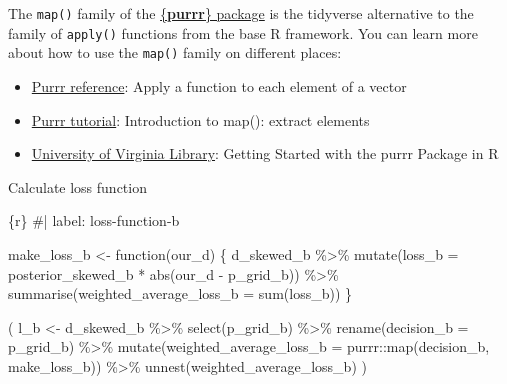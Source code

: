\documentclass[
  letterpaper,
  DIV=11,
  numbers=noendperiod]{scrreprt}
\newenvironment{Shaded}{\begin{snugshade}}{\end{snugshade}}
\newcommand{\AttributeTok}[1]{\textcolor[rgb]{0.40,0.45,0.13}{#1}}
\newcommand{\CommentTok}[1]{\textcolor[rgb]{0.37,0.37,0.37}{#1}}
\newcommand{\ControlFlowTok}[1]{\textcolor[rgb]{0.00,0.23,0.31}{#1}}
\newcommand{\FunctionTok}[1]{\textcolor[rgb]{0.28,0.35,0.67}{#1}}
\newcommand{\InformationTok}[1]{\textcolor[rgb]{0.37,0.37,0.37}{#1}}
\newcommand{\NormalTok}[1]{\textcolor[rgb]{0.00,0.23,0.31}{#1}}
\newcommand{\OtherTok}[1]{\textcolor[rgb]{0.00,0.23,0.31}{#1}}
\newcommand{\SpecialCharTok}[1]{\textcolor[rgb]{0.37,0.37,0.37}{#1}}
\providecommand{\tightlist}{%
  \setlength{\itemsep}{0pt}\setlength{\parskip}{0pt}}\usepackage{longtable,booktabs,array}
\begin{document}
The \texttt{map()} family of the
\href{https://purrr.tidyverse.org/}{\{\textbf{purrr}\} package} is the
tidyverse alternative to the family of \texttt{apply()} functions from
the base R framework. You can learn more about how to use the
\texttt{map()} family on different places:

\begin{itemize}
\tightlist
\item
  \href{https://purrr.tidyverse.org/reference/map.html}{Purrr
  reference}: Apply a function to each element of a vector
\item
  \href{https://jennybc.github.io/purrr-tutorial/ls01_map-name-position-shortcuts.html}{Purrr
  tutorial}: Introduction to map(): extract elements
\item
  \href{https://data.library.virginia.edu/getting-started-with-the-purrr-package-in-r/}{University
  of Virginia Library}: Getting Started with the purrr Package in R
\end{itemize}

Calculate loss function

\begin{Shaded}
\begin{Highlighting}[]
\InformationTok{\textasciigrave{}\textasciigrave{}\textasciigrave{}\{r\}}
\CommentTok{\#| label: loss{-}function{-}b}

\NormalTok{make\_loss\_b }\OtherTok{\textless{}{-}} \ControlFlowTok{function}\NormalTok{(our\_d) \{}
\NormalTok{  d\_skewed\_b }\SpecialCharTok{\%\textgreater{}\%} 
    \FunctionTok{mutate}\NormalTok{(}\AttributeTok{loss\_b =}\NormalTok{ posterior\_skewed\_b }\SpecialCharTok{*} \FunctionTok{abs}\NormalTok{(our\_d }\SpecialCharTok{{-}}\NormalTok{ p\_grid\_b)) }\SpecialCharTok{\%\textgreater{}\%} 
    \FunctionTok{summarise}\NormalTok{(}\AttributeTok{weighted\_average\_loss\_b =} \FunctionTok{sum}\NormalTok{(loss\_b))}
\NormalTok{\}}

\NormalTok{(}
\NormalTok{  l\_b }\OtherTok{\textless{}{-}}
\NormalTok{  d\_skewed\_b }\SpecialCharTok{\%\textgreater{}\%} 
  \FunctionTok{select}\NormalTok{(p\_grid\_b) }\SpecialCharTok{\%\textgreater{}\%} 
  \FunctionTok{rename}\NormalTok{(}\AttributeTok{decision\_b =}\NormalTok{ p\_grid\_b) }\SpecialCharTok{\%\textgreater{}\%} 
  \FunctionTok{mutate}\NormalTok{(}\AttributeTok{weighted\_average\_loss\_b =}\NormalTok{ purrr}\SpecialCharTok{::}\FunctionTok{map}\NormalTok{(decision\_b, make\_loss\_b)) }\SpecialCharTok{\%\textgreater{}\%} 
  \FunctionTok{unnest}\NormalTok{(weighted\_average\_loss\_b) }
\NormalTok{)}
\InformationTok{\textasciigrave{}\textasciigrave{}\textasciigrave{}}
\end{Highlighting}
\end{Shaded}
\end{document}
